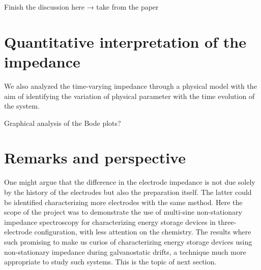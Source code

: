 \colorbox{BurntOrange}{Finish the discussion here → take from the paper}

\section{Quantitative interpretation of the impedance}

We also analyzed the time-varying impedance through a physical model with the aim of identifying the variation of physical parameter with the time evolution of the system. 

Graphical analysis of the Bode plots?

\section{Remarks and perspective}

One might argue that the difference in the electrode impedance is not due solely by the history of the electrodes but also the preparation itself. The latter could be identified characterizing more electrodes with the same method. Here the scope of the project was to demonstrate the use of multi-sine non-stationary impedance spectroscopy for characterizing energy storage devices in three-electrode configuration, with less attention on the chemistry. The results where such promising to make us curios of characterizing energy storage devices using non-stationary impedance during galvanostatic drifts, a technique much more appropriate to study such systems. This is the topic of next section.